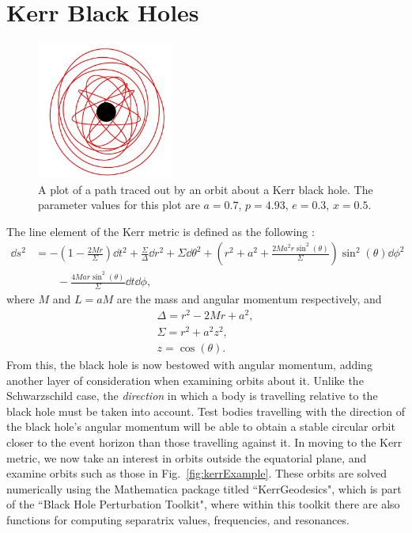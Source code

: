
\section{Kerr Black Holes}
\begin{figure}
\centering
    \includegraphics[width=0.4\textwidth]{images/KerrOrbitExample1.pdf}
    \caption[Kerr black hole example]{A plot of a path traced out by an orbit about a Kerr black hole. The parameter values for this plot are $a=0.7$, $p=4.93$, $e=0.3$, $x=0.5$.}
    \label{fig:kerrExample}
\end{figure}
The line element of the Kerr metric is defined as the following \cite{Teukolsky_2015}:
\begin{equation}\label{eqn:kerrmetric}
\begin{split}
\dd{s}^2&=-\left(1-\frac{2Mr}{\Sigma} \right)\dd{t}^2 + \frac{\Sigma}{\Delta}\dd{r}^2 +\Sigma\dd{\theta}^2+\left(r^2+a^2+\frac{2Ma^2r\sin^2(\theta)}{\Sigma}\right)\sin^2(\theta)\dd{\phi}^2\\
 &\qquad- \frac{4Mar\sin^2(\theta)}{\Sigma}\dd{t}\dd{\phi},
\end{split}
\end{equation}
where $M$ and $L=aM$ are the mass and angular momentum respectively, and
\begin{gather}
	\Delta=r^2-2Mr+a^2,\\
    \Sigma=r^2+a^2z^2,\\
    z=\cos(\theta).
\end{gather}
From this, the black hole is now bestowed with angular momentum, adding another layer of consideration when examining orbits about it.
Unlike the Schwarzschild case, the \textit{direction} in which a body is travelling relative to the black hole must be taken into account.
Test bodies travelling with the direction of the black hole's angular momentum will be able to obtain a stable circular orbit closer to the event horizon than those travelling against it.
In moving to the Kerr metric, we now take an interest in orbits outside the equatorial plane, and examine orbits such as those in Fig.~\eqref{fig:kerrExample}.
These orbits are solved numerically using the Mathematica package titled ``KerrGeodesics", which is part of the ``Black Hole Perturbation Toolkit", where within this toolkit there are also functions for computing separatrix values, frequencies, and resonances.

